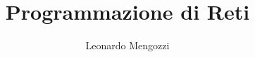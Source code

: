 \usepackage[italian]{babel}
\usepackage{fancyhdr}
\usepackage{lastpage}
\usepackage[colorlinks=true, linkcolor=black]{hyperref}
\usepackage{paracol}
\usepackage{adjustbox}
\usepackage{tikz}
\usepackage{tikz-cd}
\usepackage{amsmath}    	%
\usepackage{amssymb}		%
\usepackage{amsfonts}	    %
\usepackage{multicol}

\pagestyle{fancy}
\fancyhf{}
\fancyhead[C]{\leftmark}
\fancyhead[R]{\thepage/\pageref{LastPage}}

\newcommand{\rettangolo}[1]{

\medskip
\noindent\fbox{\parbox{\linewidth}{
		\centering\footnotesize
		#1
}}

\medskip\noindent
}

\title{Programmazione di Reti}
\author{Leonardo Mengozzi}
\date{}